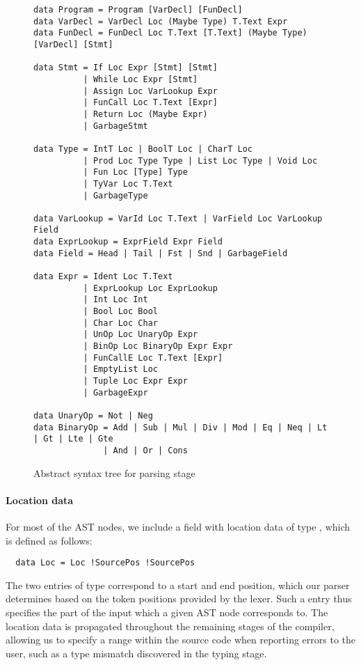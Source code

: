 \begin{figure}
\begin{verbatim}
data Program = Program [VarDecl] [FunDecl]
data VarDecl = VarDecl Loc (Maybe Type) T.Text Expr
data FunDecl = FunDecl Loc T.Text [T.Text] (Maybe Type) [VarDecl] [Stmt]

data Stmt = If Loc Expr [Stmt] [Stmt]
          | While Loc Expr [Stmt]
          | Assign Loc VarLookup Expr
          | FunCall Loc T.Text [Expr]
          | Return Loc (Maybe Expr)
          | GarbageStmt

data Type = IntT Loc | BoolT Loc | CharT Loc
          | Prod Loc Type Type | List Loc Type | Void Loc
          | Fun Loc [Type] Type
          | TyVar Loc T.Text
          | GarbageType

data VarLookup = VarId Loc T.Text | VarField Loc VarLookup Field
data ExprLookup = ExprField Expr Field
data Field = Head | Tail | Fst | Snd | GarbageField

data Expr = Ident Loc T.Text
          | ExprLookup Loc ExprLookup
          | Int Loc Int
          | Bool Loc Bool
          | Char Loc Char
          | UnOp Loc UnaryOp Expr
          | BinOp Loc BinaryOp Expr Expr
          | FunCallE Loc T.Text [Expr]
          | EmptyList Loc
          | Tuple Loc Expr Expr
          | GarbageExpr

data UnaryOp = Not | Neg
data BinaryOp = Add | Sub | Mul | Div | Mod | Eq | Neq | Lt | Gt | Lte | Gte
              | And | Or | Cons
\end{verbatim}
	\caption{Abstract syntax tree for parsing stage}
  \label{fig:parse-ast}
\end{figure}


\paragraph{Location data}
For most of the AST nodes, we include a field with location data of type
, which is defined as follows:
%
\begin{verbatim}
  data Loc = Loc !SourcePos !SourcePos
\end{verbatim}
%
The two entries of type  correspond to a start and end
position, which our parser determines based on the token positions provided by
the lexer.
Such a  entry thus specifies the part of the input which a given
AST node corresponds to. The location data is propagated throughout the
remaining stages of the compiler, allowing us to specify a range within the
source code when reporting errors to the user, such as a type mismatch
discovered in the typing stage.


